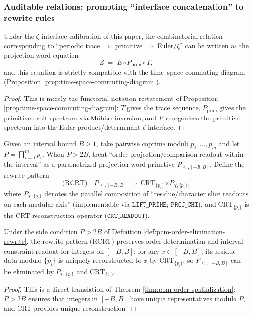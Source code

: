 \subsubsection{Auditable relations: promoting ``interface concatenation'' to rewrite rules}
\begin{proposition}\label{prop:pom-zeta-factorization-rewrite}
Under the \(\zeta\) interface calibration of this paper, the combinatorial relation corresponding to ``periodic trace \(\Rightarrow\) primitive \(\Rightarrow\) Euler/\(\zeta\)'' can be written as the projection word equation
$$
Z \;=\; E\circ P_{\mathrm{prim}}\circ T,
$$
and this equation is strictly compatible with the time--space commuting diagram (Proposition \ref{prop:time-space-commuting-diagram}).
\end{proposition}
\begin{proof}
This is merely the functorial notation restatement of Proposition \ref{prop:time-space-commuting-diagram}: \(T\) gives the trace sequence, \(P_{\mathrm{prim}}\) gives the primitive orbit spectrum via M\"obius inversion, and \(E\) reorganizes the primitive spectrum into the Euler product/determinant \(\zeta\) interface.
\end{proof}

\begin{definition}\label{def:pom-order-elimination-rewrite}
Given an interval bound \(B\ge 1\), take pairwise coprime moduli \(p_1,\dots,p_m\) and let \(P=\prod_{i=1}^m p_i\).
When \(P>2B\), treat ``order projection/comparison readout within the interval'' as a parametrized projection word primitive \(P_{\le,[-B,B]}\).
Define the rewrite pattern
$$
\text{(RCRT)}\quad
P_{\le,[-B,B]}
\ \Longrightarrow\
\mathrm{CRT}_{\{p_i\}}\circ P_{\chi,\{p_i\}},
$$
where \(P_{\chi,\{p_i\}}\) denotes the parallel composition of ``residue/character slice readouts on each modular axis'' (implementable via \(\texttt{LIFT\_PRIME; PROJ\_CHI}\)), and \(\mathrm{CRT}_{\{p_i\}}\) is the CRT reconstruction operator (\(\texttt{CRT\_READOUT}\)).
\end{definition}

\begin{proposition}\label{prop:pom-order-elimination-correct}
Under the side condition \(P>2B\) of Definition \ref{def:pom-order-elimination-rewrite}, the rewrite pattern (RCRT) preserves order determination and interval constraint readout for integers on \([-B,B]\): for any \(x\in[-B,B]\), its residue data modulo \(\{p_i\}\) is uniquely reconstructed to \(x\) by \(\mathrm{CRT}_{\{p_i\}}\), so \(P_{\le,[-B,B]}\) can be eliminated by \(P_{\chi,\{p_i\}}\) and \(\mathrm{CRT}_{\{p_i\}}\).
\end{proposition}
\begin{proof}
This is a direct translation of Theorem \ref{thm:pom-order-spatialization}: \(P>2B\) ensures that integers in \([-B,B]\) have unique representatives modulo \(P\), and CRT provides unique reconstruction.
\end{proof}

